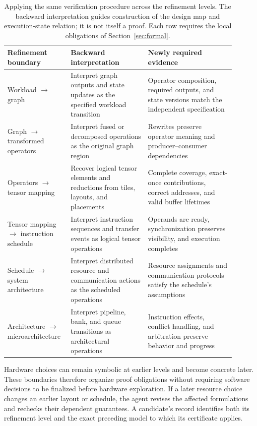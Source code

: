 \documentclass[11pt]{article}
\begin{document}
\begin{table}[htbp]
\centering\small
\begin{tabular}{p{0.23\linewidth}p{0.32\linewidth}p{0.36\linewidth}}
\toprule
Refinement boundary & Backward interpretation & Newly required evidence \\
\midrule
Workload $\rightarrow$ graph & Interpret graph outputs and state updates as the specified workload transition & Operator composition, required outputs, and state versions match the independent specification \\
Graph $\rightarrow$ transformed operators & Interpret fused or decomposed operations as the original graph region & Rewrites preserve operator meaning and producer--consumer dependencies \\
Operators $\rightarrow$ tensor mapping & Recover logical tensor elements and reductions from tiles, layouts, and placements & Complete coverage, exact-once contributions, correct addresses, and valid buffer lifetimes \\
Tensor mapping $\rightarrow$ instruction schedule & Interpret instruction sequences and transfer events as logical tensor operations & Operands are ready, synchronization preserves visibility, and execution completes \\
Schedule $\rightarrow$ system architecture & Interpret distributed resource and communication actions as the scheduled operations & Resource assignments and communication protocols satisfy the schedule's assumptions \\
Architecture $\rightarrow$ microarchitecture & Interpret pipeline, bank, and queue transitions as architectural operations & Instruction effects, conflict handling, and arbitration preserve behavior and progress \\
\bottomrule
\end{tabular}
\caption{Applying the same verification procedure across the refinement levels. The backward interpretation guides construction of the design map and execution-state relation; it is not itself a proof. Each row requires the local obligations of Section~\ref{sec:formal}.}\label{tab:refinement-maps}
\end{table}

Hardware choices can remain symbolic at earlier levels and become concrete later. These boundaries therefore organize proof obligations without requiring software decisions to be finalized before hardware exploration. If a later resource choice changes an earlier layout or schedule, the agent revises the affected formulations and rechecks their dependent guarantees. A candidate's record identifies both its refinement level and the exact preceding model to which its certificate applies.
\end{document}
